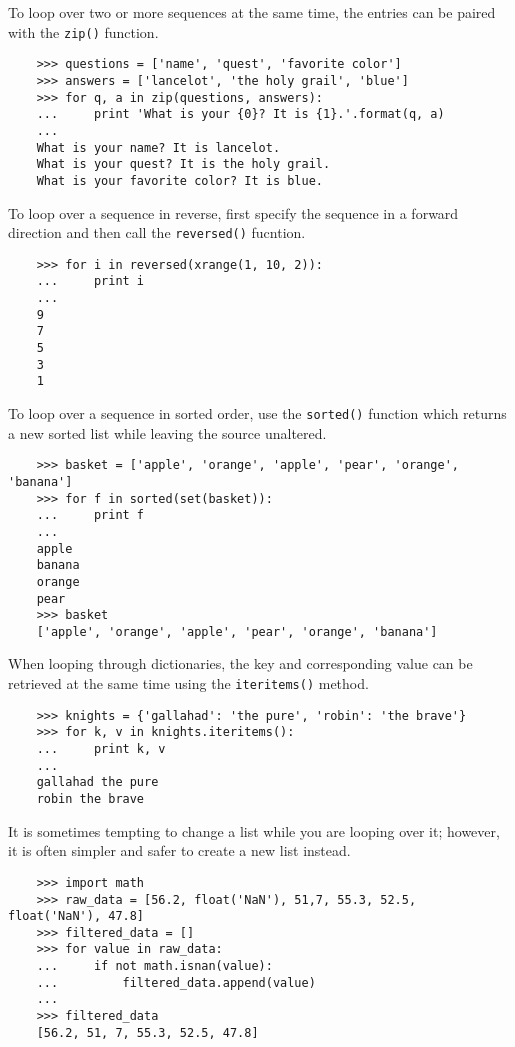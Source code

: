 \documentclass[UTF8]{article}
\begin{document}
To loop over two or more sequences at the same time, the entries can be paired with the
\texttt{zip()} function.
\begin{verbatim}
    >>> questions = ['name', 'quest', 'favorite color']
    >>> answers = ['lancelot', 'the holy grail', 'blue']
    >>> for q, a in zip(questions, answers):
    ...     print 'What is your {0}? It is {1}.'.format(q, a)
    ...
    What is your name? It is lancelot.
    What is your quest? It is the holy grail.
    What is your favorite color? It is blue.
\end{verbatim}

To loop over a sequence in reverse, first specify the sequence in a forward direction and then
call the \texttt{reversed()} fucntion.
\begin{verbatim}
    >>> for i in reversed(xrange(1, 10, 2)):
    ...     print i
    ...
    9
    7
    5
    3
    1
\end{verbatim}

To loop over a sequence in sorted order, use the \texttt{sorted()} function which returns a new
sorted list while leaving the source unaltered.
\begin{verbatim}
    >>> basket = ['apple', 'orange', 'apple', 'pear', 'orange', 'banana']
    >>> for f in sorted(set(basket)):
    ...     print f
    ...
    apple
    banana
    orange
    pear
    >>> basket
    ['apple', 'orange', 'apple', 'pear', 'orange', 'banana']
\end{verbatim}

When looping through dictionaries, the key and corresponding value can be retrieved at the same
time using the \texttt{iteritems()} method.
\begin{verbatim}
    >>> knights = {'gallahad': 'the pure', 'robin': 'the brave'}
    >>> for k, v in knights.iteritems():
    ...     print k, v
    ...
    gallahad the pure
    robin the brave
\end{verbatim}

It is sometimes tempting to change a list while you are looping over it; however, it is often
simpler and safer to create a new list instead.
\begin{verbatim}
    >>> import math
    >>> raw_data = [56.2, float('NaN'), 51,7, 55.3, 52.5, float('NaN'), 47.8]
    >>> filtered_data = []
    >>> for value in raw_data:
    ...     if not math.isnan(value):
    ...         filtered_data.append(value)
    ...
    >>> filtered_data
    [56.2, 51, 7, 55.3, 52.5, 47.8]
\end{verbatim}
\end{document}
